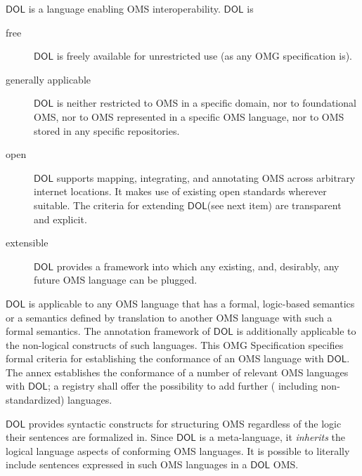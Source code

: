 \documentclass[10pt,fleqn,final]{scrreprt}
\newcommand*{\IS}{OMG Specification\xspace}
\newcommand*{\DOL}{\ensuremath{\mathsf{DOL}}\xspace}
\newenvironment{definitions}[0]{\medskip }{}
\begin{document}
\begin{definitions}
\DOL is a language enabling OMS interoperability. 
\DOL is
\begin{description}
\item[free] \DOL is freely available for unrestricted use (as any OMG specification is).
\item[generally applicable] \DOL is neither restricted to OMS in a specific domain, nor to foundational OMS, nor to OMS represented in a specific OMS language, nor to OMS stored in any specific repositories.
\item[open] \DOL supports mapping, integrating, and annotating OMS across arbitrary internet locations.  It makes use of existing open standards wherever suitable.  The criteria for extending \DOL (see next item) are transparent and explicit.
\item[extensible] \DOL provides a framework into which any existing, and, desirably, any future OMS language can be plugged.
\end{description}
\DOL is applicable to any OMS language that has a formal, logic-based semantics or a semantics defined by translation to another OMS language with such a formal semantics. The annotation framework of \DOL is additionally applicable to the non-logical constructs of such languages. This \IS specifies formal criteria for establishing the conformance of an OMS language with \DOL.  The annex establishes the conformance of a number of relevant OMS languages with \DOL; a registry shall offer the possibility to add further ( including non-standardized) languages. 

\DOL provides syntactic constructs for structuring OMS regardless of the logic their sentences are formalized in. 
Since \DOL is a meta-language,  it \textit{inherits} the logical language aspects of conforming OMS languages.  It is possible to literally include sentences expressed in such OMS languages in a \DOL OMS.



\end{definitions}
\end{document}
